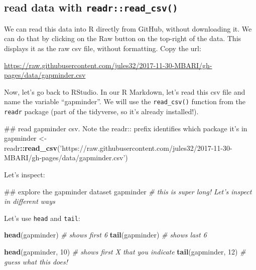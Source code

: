 \documentclass[]{book}
\newenvironment{Shaded}{\begin{snugshade}}{\end{snugshade}}
\newcommand{\KeywordTok}[1]{\textcolor[rgb]{0.13,0.29,0.53}{\textbf{#1}}}
\newcommand{\DecValTok}[1]{\textcolor[rgb]{0.00,0.00,0.81}{#1}}
\newcommand{\StringTok}[1]{\textcolor[rgb]{0.31,0.60,0.02}{#1}}
\newcommand{\CommentTok}[1]{\textcolor[rgb]{0.56,0.35,0.01}{\textit{#1}}}
\newcommand{\OperatorTok}[1]{\textcolor[rgb]{0.81,0.36,0.00}{\textbf{#1}}}
\newcommand{\NormalTok}[1]{#1}
\theoremstyle{definition}
\theoremstyle{definition}
\theoremstyle{definition}
\theoremstyle{remark}
\begin{document}
\subsection{\texorpdfstring{read data with
\texttt{readr::read\_csv()}}{read data with readr::read\_csv()}}\label{read-data-with-readrread_csv}

We can read this data into R directly from GitHub, without downloading
it. We can do that by clicking on the Raw button on the top-right of the
data. This displays it as the raw csv file, without formatting. Copy the
url:

\url{https://raw.githubusercontent.com/jules32/2017-11-30-MBARI/gh-pages/data/gapminder.csv}

Now, let's go back to RStudio. In our R Markdown, let's read this csv
file and name the variable ``gapminder''. We will use the
\texttt{read\_csv()} function from the \texttt{readr} package (part of
the tidyverse, so it's already installed!).

\begin{Shaded}
\begin{Highlighting}[]
\NormalTok{## read gapminder csv. Note the readr:: prefix identifies which package it's in}
\NormalTok{gapminder <-}\StringTok{ }\NormalTok{readr}\OperatorTok{::}\KeywordTok{read_csv}\NormalTok{(}\StringTok{'https://raw.githubusercontent.com/jules32/2017-11-30-MBARI/gh-pages/data/gapminder.csv'}\NormalTok{) }
\end{Highlighting}
\end{Shaded}

Let's inspect:

\begin{Shaded}
\begin{Highlighting}[]
\NormalTok{## explore the gapminder dataset}
\NormalTok{gapminder }\CommentTok{# this is super long! Let's inspect in different ways}
\end{Highlighting}
\end{Shaded}

Let's use \texttt{head} and \texttt{tail}:

\begin{Shaded}
\begin{Highlighting}[]
\KeywordTok{head}\NormalTok{(gapminder) }\CommentTok{# shows first 6}
\KeywordTok{tail}\NormalTok{(gapminder) }\CommentTok{# shows last 6}

\KeywordTok{head}\NormalTok{(gapminder, }\DecValTok{10}\NormalTok{) }\CommentTok{# shows first X that you indicate}
\KeywordTok{tail}\NormalTok{(gapminder, }\DecValTok{12}\NormalTok{) }\CommentTok{# guess what this does!}
\end{Highlighting}
\end{Shaded}
\end{document}
